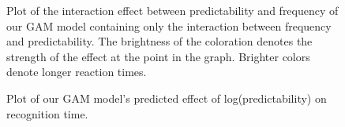 \documentclass[
  authoryear,
  preprint,
  1p,
  onecolumn]{elsarticle}
\begin{document}
\begin{figure}


\caption{\label{fig-gam2dplot1}Plot of the interaction effect between
predictability and frequency of our GAM model containing only the
interaction between frequency and predictability. The brightness of the
coloration denotes the strength of the effect at the point in the graph.
Brighter colors denote longer reaction times.}

\end{figure}%

\begin{figure}


\caption{\label{fig-gammodelinterplot}Plot of our GAM model's predicted
effect of log(predictability) on recognition time.}

\end{figure}%
\end{document}
